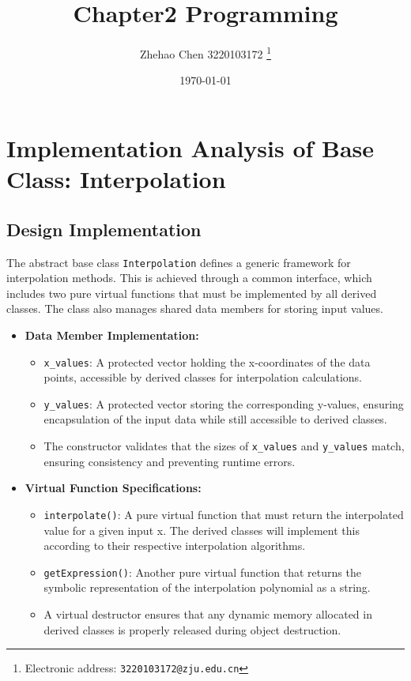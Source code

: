 \documentclass{article}
\title{\textbf{Chapter2 Programming}}
\author{Zhehao Chen 3220103172
  \thanks{Electronic address: \texttt{3220103172@zju.edu.cn}}}
\date{\today}
\begin{document}
\maketitle

\section{Implementation Analysis of Base Class: Interpolation}

\subsection{Design Implementation}
The abstract base class \texttt{Interpolation} defines a generic framework for interpolation methods. This is achieved through a common interface, which includes two pure virtual functions that must be implemented by all derived classes. The class also manages shared data members for storing input values.

\begin{itemize}
    \item \textbf{Data Member Implementation:}
    \begin{itemize}
        \item \texttt{x\_values}: A protected vector holding the x-coordinates of the data points, accessible by derived classes for interpolation calculations.
        \item \texttt{y\_values}: A protected vector storing the corresponding y-values, ensuring encapsulation of the input data while still accessible to derived classes.
        \item The constructor validates that the sizes of \texttt{x\_values} and \texttt{y\_values} match, ensuring consistency and preventing runtime errors.
    \end{itemize}
    
    \item \textbf{Virtual Function Specifications:}
    \begin{itemize}
        \item \texttt{interpolate()}: A pure virtual function that must return the interpolated value for a given input x. The derived classes will implement this according to their respective interpolation algorithms.
        \item \texttt{getExpression()}: Another pure virtual function that returns the symbolic representation of the interpolation polynomial as a string.
        \item A virtual destructor ensures that any dynamic memory allocated in derived classes is properly released during object destruction.
    \end{itemize}
\end{itemize}
\end{document}
